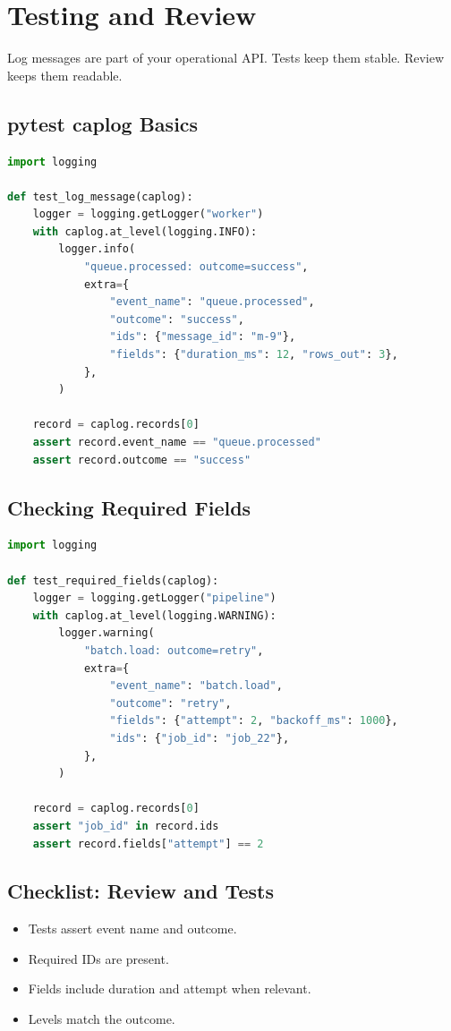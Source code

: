 \chapter{Testing and Review}
Log messages are part of your operational API. Tests keep them stable. Review keeps them readable.

\section{pytest caplog Basics}
\begin{lstlisting}[language=Python]
import logging

def test_log_message(caplog):
    logger = logging.getLogger("worker")
    with caplog.at_level(logging.INFO):
        logger.info(
            "queue.processed: outcome=success",
            extra={
                "event_name": "queue.processed",
                "outcome": "success",
                "ids": {"message_id": "m-9"},
                "fields": {"duration_ms": 12, "rows_out": 3},
            },
        )

    record = caplog.records[0]
    assert record.event_name == "queue.processed"
    assert record.outcome == "success"
\end{lstlisting}

\section{Checking Required Fields}
\begin{lstlisting}[language=Python]
import logging

def test_required_fields(caplog):
    logger = logging.getLogger("pipeline")
    with caplog.at_level(logging.WARNING):
        logger.warning(
            "batch.load: outcome=retry",
            extra={
                "event_name": "batch.load",
                "outcome": "retry",
                "fields": {"attempt": 2, "backoff_ms": 1000},
                "ids": {"job_id": "job_22"},
            },
        )

    record = caplog.records[0]
    assert "job_id" in record.ids
    assert record.fields["attempt"] == 2
\end{lstlisting}

\section{Checklist: Review and Tests}
\begin{itemize}
\item Tests assert event name and outcome.
\item Required IDs are present.
\item Fields include duration and attempt when relevant.
\item Levels match the outcome.
\end{itemize}

